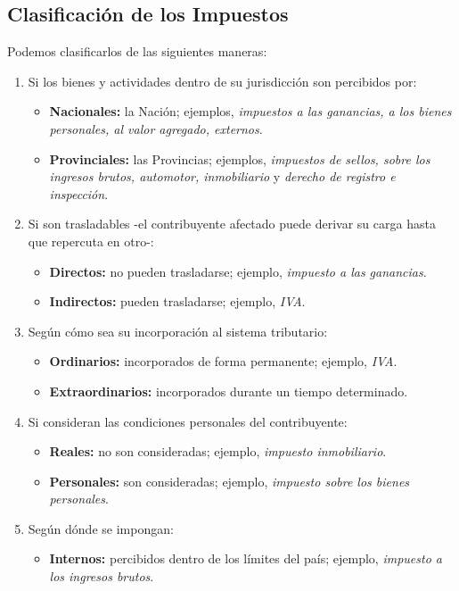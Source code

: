 \documentclass[10pt,a4paper]{article}
\begin{document}
\subsection{Clasificación de los Impuestos}

Podemos clasificarlos de las siguientes maneras:
\begin{enumerate}
\item Si los bienes y actividades dentro de su jurisdicción son percibidos por:
\begin{itemize}
\item \textbf{Nacionales:} la Nación; ejemplos, \textit{impuestos a las ganancias, a los bienes personales, al valor agregado, externos}.
\item \textbf{Provinciales:} las Provincias; ejemplos, \textit{impuestos de sellos, sobre los ingresos brutos, automotor, inmobiliario} y \textit{derecho de registro e inspección}.
\end{itemize}
\item Si son trasladables -el contribuyente afectado puede derivar su carga hasta que repercuta en otro-:
\begin{itemize}
\item \textbf{Directos:} no pueden trasladarse; ejemplo, \textit{impuesto a las ganancias}.
\item \textbf{Indirectos:} pueden trasladarse; ejemplo, \textit{IVA}.
\end{itemize}
\item Según cómo sea su incorporación al sistema tributario:
\begin{itemize}
\item \textbf{Ordinarios:} incorporados de forma permanente; ejemplo, \textit{IVA}.
\item \textbf{Extraordinarios:} incorporados durante un tiempo determinado.
\end{itemize}
\item Si consideran las condiciones personales del contribuyente:
\begin{itemize}
\item \textbf{Reales:} no son consideradas; ejemplo, \textit{impuesto inmobiliario}.
\item \textbf{Personales:} son consideradas; ejemplo, \textit{impuesto sobre los bienes personales}.
\end{itemize}
\item Según dónde se impongan:
\begin{itemize}
\item \textbf{Internos:} percibidos dentro de los límites del país; ejemplo, \textit{impuesto a los ingresos brutos}.

\end{itemize}
\end{enumerate}
\end{document}
